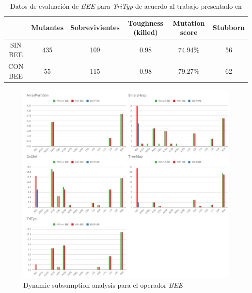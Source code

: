 \begin{table}[]
	\caption[Resultados de la evaluaci\'on de \emph{BEE} para \emph{TriTyp}]{Datos de evaluaci\'on de \emph{BEE} para \emph{TriTyp} de acuerdo al trabajo presentado en \cite{bibliography.mutation.operators.beeBridaS17}}
	\label{tables.examples.bee.paperResults.trityp}
	\centering
	\scriptsize
	\def\arraystretch{0.95}
	\setlength\tabcolsep{0.5mm}
	\begin{tabular}{c|ccccc|}
		\cline{2-6}
		& Mutantes & Sobrevivientes & Toughness (killed) & Mutation score & Stubborn \\ \hline
		\multicolumn{1}{|c|}{SIN BEE} & 435 & 109 & 0.98 & 74.94\% & 56 \\ \hline
		\multicolumn{1}{|c|}{CON BEE} & 55 & 115 & 0.98 & 79.27\% & 62 \\ \hline
	\end{tabular}
\end{table}

\begin{figure}[t]
	\begin{center}
		\includegraphics[width=12cm]{figures/BEETables.png}
	\end{center}
	\caption{Dynamic subsumption analysis para el operador \emph{BEE}}
	\label{subsumption-results-bee}
\end{figure}
